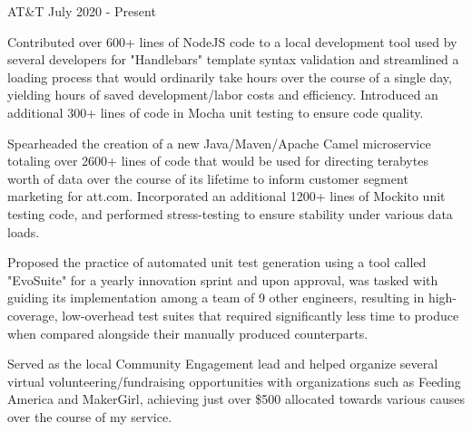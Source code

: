 

\begin{cventries}

  \cventry
    {} %
    {AT\&T } %
    {July 2020 - Present}%
    {} %
    {
        \vspace{-4.0mm}
      \begin{cvitems} %
        \item {Contributed over 600+ lines of NodeJS code to a local development tool used by several developers for "Handlebars" template syntax validation and streamlined a loading process that would ordinarily take hours over the course of a single day, yielding hours of saved development/labor costs and efficiency. Introduced an additional 300+ lines of code in Mocha unit testing to ensure code quality.}
        \item {Spearheaded the creation of a new Java/Maven/Apache Camel microservice totaling over 2600+ lines of code 
          that would be used for directing terabytes worth of data over the course of its lifetime to inform customer 
          segment marketing for att.com. Incorporated an additional 1200+ lines of Mockito unit testing code, and performed 
          stress-testing to ensure stability under various data loads.}
         \item {Proposed the practice of automated unit test generation using a tool called "EvoSuite" for a yearly innovation sprint and upon approval, was tasked with guiding its implementation among a team of 9 other engineers, resulting in high-coverage, low-overhead test suites that required significantly less time to produce when compared alongside their manually produced counterparts.}
        \item {Served as the local Community Engagement lead and helped organize several virtual volunteering/fundraising opportunities with organizations such as Feeding America and MakerGirl, achieving just over \$500 allocated towards various causes over the course of my service.}
      \end{cvitems}
    }


\end{cventries}
